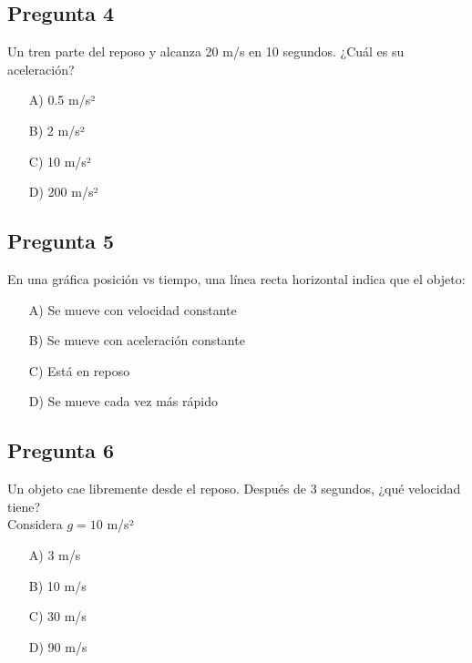 \begin{preguntabox}
\subsection{Pregunta 4}
Un tren parte del reposo y alcanza 20 m/s en 10 segundos. ¿Cuál es su aceleración?

\begin{enumerate}
    \item[A)] 0.5 m/s²
    \item[B)] 2 m/s²
    \item[C)] 10 m/s²
    \item[D)] 200 m/s²
\end{enumerate}
\end{preguntabox}

\newpage

\begin{preguntabox}
\subsection{Pregunta 5}
En una gráfica posición vs tiempo, una línea recta horizontal indica que el objeto:

\begin{enumerate}
    \item[A)] Se mueve con velocidad constante
    \item[B)] Se mueve con aceleración constante
    \item[C)] Está en reposo
    \item[D)] Se mueve cada vez más rápido
\end{enumerate}
\end{preguntabox}

\begin{preguntabox}
\subsection{Pregunta 6}
Un objeto cae libremente desde el reposo. Después de 3 segundos, ¿qué velocidad tiene?\\
Considera $g = 10$ m/s²

\begin{enumerate}
    \item[A)] 3 m/s
    \item[B)] 10 m/s
    \item[C)] 30 m/s
    \item[D)] 90 m/s
\end{enumerate}
\end{preguntabox}


